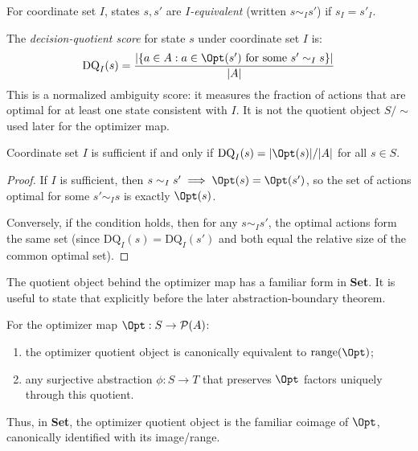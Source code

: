 \begin{definition}\label{def:decision-equiv}
For coordinate set $I$, states $s, s'$ are \emph{$I$-equivalent} (written $s \sim_I s'$) if $s_I = s'_I$.
\end{definition}

\begin{definition}\label{def:decision-quotient}
The \emph{decision-quotient score} for state $s$ under coordinate set $I$ is:
\[
\text{DQ}_I(s) = \frac{|\{a \in A : a \in \Opt(s') \text{ for some } s' \sim_I s\}|}{|A|}
\]
This is a normalized ambiguity score: it measures the fraction of actions that are optimal for at least one state consistent with $I$. It is not the quotient object $S/{\sim}$ used later for the optimizer map.
\end{definition}

\begin{proposition}\label{prop:sufficiency-char}
Coordinate set $I$ is sufficient if and only if $\text{DQ}_I(s) = |\Opt(s)|/|A|$ for all $s \in S$.
\end{proposition}

\begin{proof}
If $I$ is sufficient, then $s \sim_I s' \implies \Opt(s) = \Opt(s')$, so the set of actions optimal for some $s' \sim_I s$ is exactly $\Opt(s)$.

Conversely, if the condition holds, then for any $s \sim_I s'$, the optimal actions form the same set (since $\text{DQ}_I(s) = \text{DQ}_I(s')$ and both equal the relative size of the common optimal set).
\end{proof}

The quotient object behind the optimizer map has a familiar form in \textbf{Set}. It is useful to state that explicitly before the later abstraction-boundary theorem.

\begin{proposition}\label{prop:optimizer-coimage}
For the optimizer map $\Opt : S \to \mathcal{P}(A)$:
\begin{enumerate}
\item the optimizer quotient object is canonically equivalent to $\mathrm{range}(\Opt)$;
\item any surjective abstraction $\phi : S \to T$ that preserves $\Opt$ factors uniquely through this quotient.
\end{enumerate}
Thus, in \textbf{Set}, the optimizer quotient object is the familiar coimage of $\Opt$, canonically identified with its image/range.\cite{maclane1998categories}
\end{proposition}

